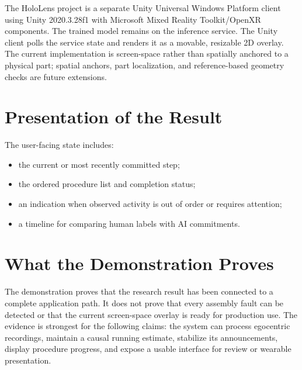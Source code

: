 The HoloLens project is a separate Unity Universal Windows Platform client
using Unity 2020.3.28f1 with Microsoft Mixed Reality Toolkit/OpenXR components.
The trained model remains on the inference service. The Unity client polls the
service state and renders it as a movable, resizable 2D overlay. The current
implementation is screen-space rather than spatially anchored to a physical
part; spatial anchors, part localization, and reference-based geometry checks
are future extensions.

\section{Presentation of the Result}
The user-facing state includes:
\begin{itemize}
    \item the current or most recently committed step;
    \item the ordered procedure list and completion status;
    \item an indication when observed activity is out of order or requires
    attention;
    \item a timeline for comparing human labels with AI commitments.
\end{itemize}

\section{What the Demonstration Proves}

The demonstration proves that the research result has been connected to a
complete application path. It does not prove that every assembly fault can be
detected or that the current screen-space overlay is ready for production use.
The evidence is strongest for the following claims: the system can process
egocentric recordings, maintain a causal running estimate, stabilize its
announcements, display procedure progress, and expose a usable interface for
review or wearable presentation.
